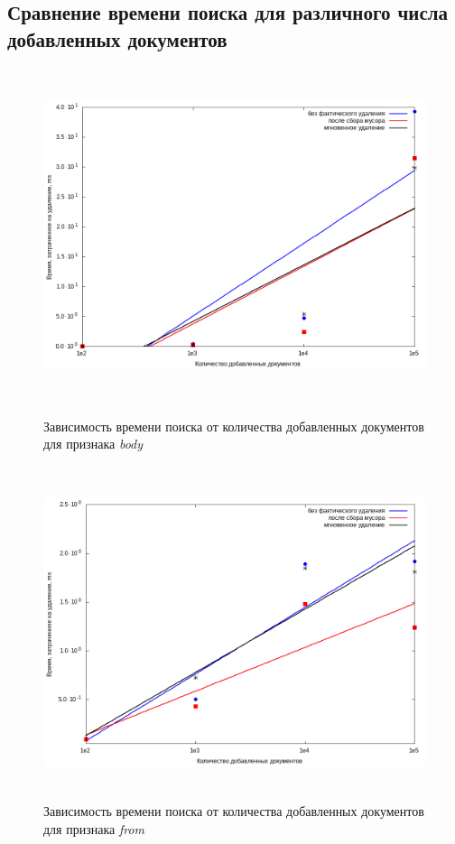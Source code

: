 \subsection{Сравнение времени поиска для различного числа добавленных документов}

\begin{figure}[H]
\includegraphics[width=\linewidth, height=9.75cm]{fig/body.png}
\caption{Зависимость времени поиска от количества добавленных документов для признака \textit{body}}
\includegraphics[width=\linewidth, height=9.75cm]{fig/from.png}
\caption{Зависимость времени поиска от количества добавленных документов для признака \textit{from}}
\end{figure}

